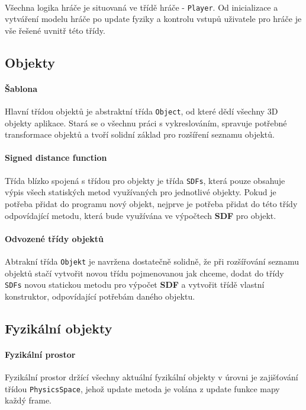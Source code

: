 \documentclass[a4paper, 12pt]{article}
\begin{document}
\paragraph{}
Všechna logika hráče je situovaná ve třídě hráče - \texttt{Player}. Od
inicializace a vytváření modelu hráče po update fyziky a kontrolu vstupů
uživatele pro hráče je vše řešené uvnitř této třídy.

\subsection{Objekty}
\paragraph{Šablona}
Hlavní třídou objektů je abstraktní třída \texttt{Object}, od které dědí
všechny 3D objekty aplikace. Stará se o všechnu práci s vykreslováním, spravuje
potřebné transformace objektů a tvoří solidní základ pro rozšíření seznamu
objektů. 

\paragraph{Signed distance function}
Třída blízko spojená s třídou pro objekty je třída \texttt{SDFs}, která pouze
obsahuje výpis všech statiských metod využívaných pro jednotlivé objekty. Pokud
je potřeba přidat do programu nový objekt, nejprve je potřeba přidat do této
třídy odpovídající metodu, která bude využívána ve výpočtech \textbf{SDF} pro
objekt.

\paragraph{Odvozené třídy objektů}
Abtrakní třída \texttt{Objekt} je navržena dostatečně solidně, že při
rozšířování seznamu objektů stačí vytvořit novou třídu pojmenovanou jak chceme,
dodat do třídy \texttt{SDFs} novou statickou metodu pro výpočet \textbf{SDF} a
vytvořit třídě vlastní konstruktor, odpovídající potřebám daného objektu.

\subsection{Fyzikální objekty}
\paragraph{Fyzikální prostor} 
Fyzikální prostor držící všechny aktuální fyzikální objekty v úrovni je
zajišťování třídou \texttt{PhysicsSpace}, jehož update metoda je volána z
update funkce mapy každý frame.
\end{document}
